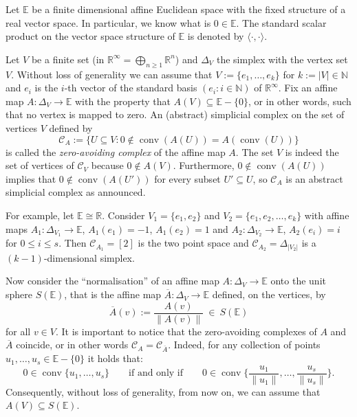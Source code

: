 \documentclass[a4paper,11pt,reqno, english]{amsart}
\theoremstyle{definition}
\theoremstyle{remark}
\newcommand\R{\mathbb R}
\newcommand\N{\mathbb N}
\newcommand\CC{\mathscr C}
\newcommand\E{\mathbb{E}}
\DeclareMathOperator{\conv}{\mathrm{conv}}
\begin{document}
Let $\E$ be a finite dimensional affine Euclidean space with the fixed structure of a real vector space.
In particular, we know what is $0\in \E$.
The standard scalar product on the vector space structure of $\E$ is denoted by $\langle\cdot,\cdot\rangle$.

\medskip
Let $V$ be a finite set (in $\R^{\infty}=\bigoplus_{n\geq 1}\R^n$) and $\Delta_V$ the simplex with the vertex set $V$.
Without loss of generality we can assume that $V:=\{e_1,\dots, e_k\}$ for $k:=|V|\in\N$ and $e_i$ is the $i$-th vector of the standard basis $(e_i : i\in\N)$ of  $\R^{\infty}$.
Fix an affine map $A\colon \Delta_V\longrightarrow\E$ with the property that  $A(V)\subseteq \E-\{0\}$, or in other words, such that no vertex is mapped to zero.
An (abstract) simplicial complex on the set of vertices $V$ defined by
\begin{equation}\label{def of zero-avoiding complex}
	\CC_A:=\{U\subseteq V : 0\notin \conv(A(U))=A(\conv(U))\}
\end{equation}
is called the {\em zero-avoiding complex} of the affine map $A$.
The set $V$ is indeed the set of vertices of $\CC_V$ because $0\notin A(V)$.
Furthermore, $0\notin \conv(A(U))$ implies that $0\notin \conv(A(U'))$ for every subset $U'\subseteq U$, so $\CC_A$ is  an abstract simplicial complex as announced.

\medskip
For example, let $\E\cong \R$.
Consider $V_1=\{e_1,e_2\}$ and $V_2=\{e_1,e_2,\dots, e_k\}$ with affine maps $A_1\colon\Delta_{V_1}\longrightarrow\E$, $A_1(e_1)=-1$, $A_1(e_2)=1$ and $A_2\colon\Delta_{V_2}\longrightarrow\E$, $A_2(e_i)=i$ for $0\leq i\leq s$.
Then $\CC_{A_1}=[2]$ is the two point space and $\CC_{A_2}=\Delta_{|V_2|}$ is a $(k-1)$-dimensional simplex.


\medskip
Now consider the ``normalisation'' of an affine map $A\colon \Delta_V\longrightarrow\E$  onto the unit sphere $S(\E)$, that is the affine map $\overline{A}\colon \Delta_V\longrightarrow\E$ defined, on the vertices, by
\[
	\overline{A}(v):=\frac{A(v)}{\|A(v)\|} \ \in \ S(\E)
\]
for all $v\in V$.
It is important to notice that the zero-avoiding complexes of $A$ and $\overline{A}$ coincide, or in other words $\CC_A=\CC_{\overline{A}}$.
Indeed, for any collection of points $u_1,\dots, u_s\in \E-\{0\}$ it holds that:
\[
	0\in \conv\{u_1,\dots, u_s\}
	\qquad\text{if and only if}\qquad
	0\in \conv\Big\{\frac{u_1}{\|u_1\|},\dots, \frac{u_s}{\|u_s\|}\Big\}.
\]
Consequently, without loss of generality, from now on, we can assume that $A(V)\subseteq S(\E)$.
\end{document}
